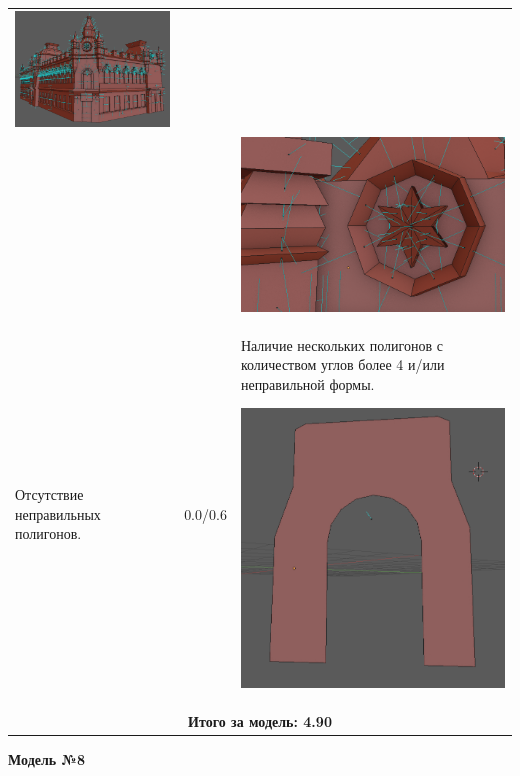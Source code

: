 \begin{longtable}{|p{4cm}|p{2.5cm}|p{7.5cm}|}
    \includegraphics[width=7cm]{src/norm_13}\\
    & & \includegraphics[width=7cm]{src/norm_14}\\
    \hline 
    Отсутствие неправильных полигонов. & 0.0/0.6 & Наличие нескольких полигонов с количеством углов более 4 и/или неправильной формы.

    \includegraphics[width=7cm]{src/poly_7}\\
    \hline
    \multicolumn{3}{|c|}{\textbf{Итого за модель: 4.90}}\\
    \hline
\end{longtable}

\begin{center}
    \textbf{Модель №8}
\end{center}

